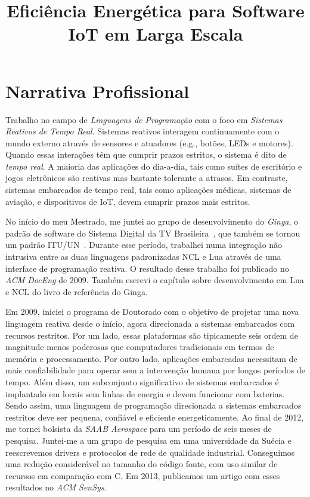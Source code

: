 \documentclass[12pt,english]{amsart}
\title{Eficiência Energética para Software IoT em Larga Escala}
\begin{document}
\date{}
\maketitle

\vspace{-1cm}

\section{Narrativa Profissional}

Trabalho no campo de \emph{Linguagens de Programação} com o foco em 
\emph{Sistemas Reativos de Tempo Real}.
Sistemas reativos interagem continuamente com o mundo externo através de
sensores e atuadores (e.g., botões, LEDs e motores).
Quando essas interações têm que cumprir prazos estritos, o sistema é dito de
\emph{tempo real}.
A maioria das aplicações do dia-a-dia, tais como suítes de escritório e jogos
eletrônicos são reativas mas bastante tolerante a atrasos.
Em contraste, sistemas embarcados de tempo real, tais como aplicações médicas,
sistemas de aviação, e dispositivos de IoT, devem cumprir prazos mais estritos.

No início do meu Mestrado, me juntei ao grupo de desenvolvimento do
\emph{Ginga}, o padrão de software do Sistema Digital da TV
Brasileira~\cite{ncl.abnt}, que também se tornou um padrão
ITU/UN~\cite{ncl.itu}.
Durante esse período, trabalhei numa integração não intrusiva entre as duas
linguagens padronizadas NCL e Lua através de uma interface de programação
reativa.
O resultado desse trabalho foi publicado no \emph{ACM DocEng} de 2009.
Também escrevi o capítulo sobre desenvolvimento em Lua e NCL do livro de
referência do Ginga.

Em 2009, iniciei o programa de Doutorado com o objetivo de projetar uma nova
linguagem reativa desde o início, agora direcionada a sistemas embarcados com
recursos restritos.
Por um lado, essas plataformas são tipicamente seis ordem de magnitude menos
poderosas que computadores tradicionais em termos de memória e processamento.
Por outro lado, aplicações embarcadas necessitam de mais confiabilidade para
operar sem a intervenção humana por longos períodos de tempo.
Além disso, um subconjunto significativo de sistemas embarcados é implantado
em locais sem linhas de energia e devem funcionar com baterias.
Sendo assim, uma linguagem de programação direcionada a sistemas embarcados
restritos deve ser pequena, confiável e eficiente energeticamente.
Ao final de 2012, me tornei bolsista da \emph{SAAB Aerospace} para um período
de seis meses de pesquisa.
Juntei-me a um grupo de pesquisa em uma universidade da Suécia e reescrevemos
drivers e protocolos de rede de qualidade industrial.
Conseguimos uma redução considerável no tamanho do código fonte, com uso
similar de recursos em comparação com C.
Em 2013, publicamos um artigo com esses resultados no \emph{ACM SenSys}.
\end{document}
